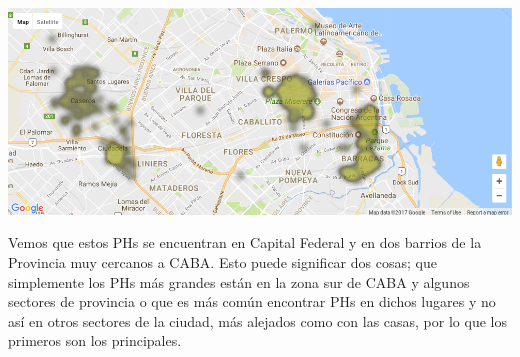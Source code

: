 \documentclass[a4paper, 10pt]{article}
\newcommand\tab[1][0.5cm]{\hspace*{#1}}
\begin{document}
				  	\begin{center}
   		    				\includegraphics[width=\textwidth]{images/phSurfaceTopMap}
				  	\end{center}
				  	\tab Vemos que estos PHs se encuentran en Capital Federal y en dos barrios de la Provincia muy cercanos a CABA.
				  	Esto puede significar dos cosas; que simplemente los PHs más grandes están en la zona sur de CABA y algunos
				  	sectores de provincia o que es más común encontrar PHs en dichos lugares y no así en otros sectores de la ciudad,
				  	más alejados como con las casas, por lo que los primeros son los principales.
\end{document}
